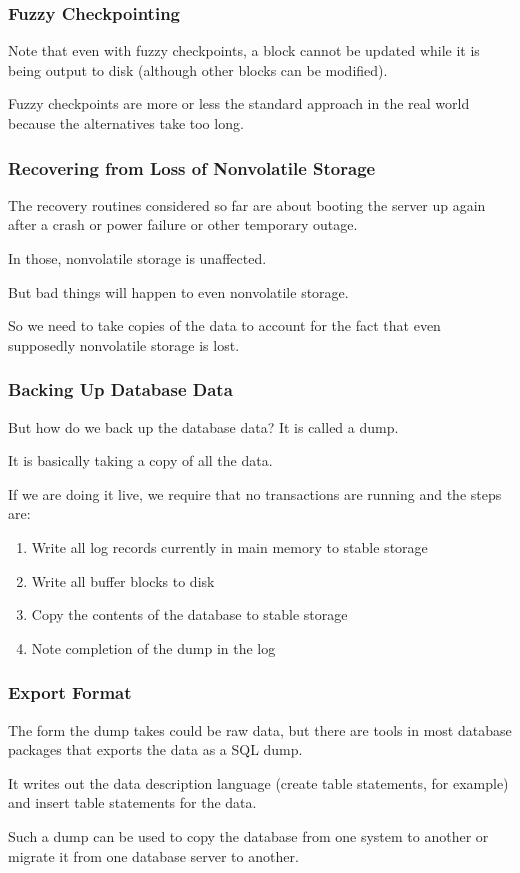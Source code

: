 \begin{frame}
\frametitle{Fuzzy Checkpointing}

Note that even with fuzzy checkpoints, a block cannot be updated while it is being output to disk (although other blocks can be modified). 

Fuzzy checkpoints are more or less the standard approach in the real world because the alternatives take too long.


\end{frame}

\begin{frame}
\frametitle{Recovering from Loss of Nonvolatile Storage}

The recovery routines considered so far are about booting the server up again after a crash or power failure or other temporary outage.

In those, nonvolatile storage is unaffected. 

But bad things will happen to even nonvolatile storage. 

So we need to take copies of the data to account for the fact that even supposedly nonvolatile storage is lost.


\end{frame}


\begin{frame}
\frametitle{Backing Up Database Data}


But how do we back up the database data? It is called a \alert{dump}. 

It is basically taking a copy of all the data.

If we are doing it live, we require that no transactions are running and the steps are:

\begin{enumerate}
	\item Write all log records currently in main memory to stable storage
	\item Write all buffer blocks to disk
	\item Copy the contents of the database to stable storage
	\item Note completion of the dump in the log
\end{enumerate}

\end{frame}

\begin{frame}
\frametitle{Export Format}

The form the dump takes could be raw data, but there are tools in most database packages that exports the data as a SQL dump. 

It writes out the data description language (create table statements, for example) and insert table statements for the data. 

Such a dump can be used to copy the database from one system to another or migrate it from one database server to another.

\end{frame}

